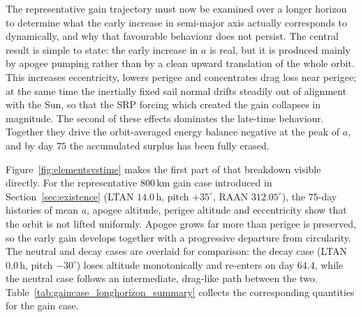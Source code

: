 \FloatBarrier
\noindent The representative gain trajectory must now be examined over a longer horizon to determine what the early increase in semi-major axis actually corresponds to dynamically, and why that favourable behaviour does not persist. The central result is simple to state: the early increase in \(a\) is real, but it is produced mainly by apogee pumping rather than by a clean upward translation of the whole orbit. This increases eccentricity, lowers perigee and concentrates drag loss near perigee; at the same time the inertially fixed sail normal drifts steadily out of alignment with the Sun, so that the SRP forcing which created the gain collapses in magnitude. The second of these effects dominates the late-time behaviour. Together they drive the orbit-averaged energy balance negative at the peak of \(a\), and by day \(75\) the accumulated surplus has been fully erased.

\vspace{5pt}
\par\noindent Figure~\ref{fig:elementsvstime} makes the first part of that breakdown visible directly. For the representative \(800\,\mathrm{km}\) gain case introduced in Section~\ref{sec:existence} (LTAN \(14.0\,\mathrm{h}\), pitch \(+35^\circ\), RAAN \(312.05^\circ\)), the \(75\)-day histories of mean \(a\), apogee altitude, perigee altitude and eccentricity show that the orbit is not lifted uniformly. Apogee grows far more than perigee is preserved, so the early gain develops together with a progressive departure from circularity. The neutral and decay cases are overlaid for comparison: the decay case (LTAN \(0.0\,\mathrm{h}\), pitch \(-30^\circ\)) loses altitude monotonically and re-enters on day \(64.4\), while the neutral case follows an intermediate, drag-like path between the two. Table~\ref{tab:gaincase_longhorizon_summary} collects the corresponding quantities for the gain case.

